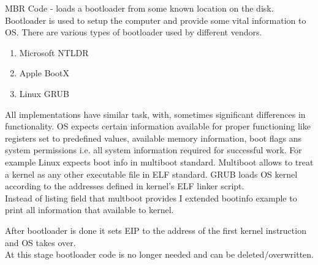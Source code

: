 \documentclass{article}
\begin{document}
        MBR Code - loads a bootloader from some known location on the disk. Bootloader is used 
        to setup the computer and provide some vital information to OS. There are various types of 
        bootloader used by different vendors.

        \begin{enumerate}[1.]
            \item Microsoft NTLDR
            \item Apple BootX
            \item Linux GRUB
        \end{enumerate}

        All implementations have similar task, with, sometimes significant differences in functionality.
        OS expects certain information available for proper functioning like registers set
        to predefined values, available
        memory information, boot flags ans system permissions i.e. all system information
        required for successful work. For example 
        Linux expects boot info in multiboot standard. Multiboot allows to treat a kernel as 
        any other executable file in ELF
        standard. GRUB loads OS kernel according to the addresses defined in kernel's ELF
        linker script.
        \\
        Instead of listing field that multboot provides I extended bootinfo example to print all 
        information that available to kernel.

        After bootloader is done it sets EIP to the address of the first kernel instruction 
        and OS takes over. \\
        At this stage bootloader code is no longer needed and can be deleted/overwritten.




    
\end{document}
